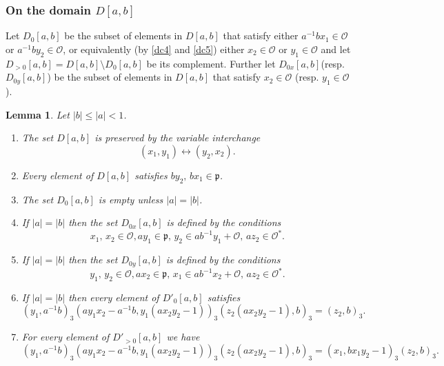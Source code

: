 \documentclass[12pt]{amsart}
\newcommand{\abs}[1]{\left|{#1}\right|}
\newcommand{\p}{\mathfrak{p}}
\renewcommand{\O}{\mathcal{O}}
\newtheorem{lemma}[theorem]{Lemma}
\theoremstyle{remark}
\begin{document}
\subsubsection{On the domain $D[a,b]$}
Let $D_0[a,b]$ be the subset of elements in $D[a,b]$ that satisfy either $a^{-1}bx_1\in\O$ or $a^{-1}by_2\in \O$, or equivalently (by \ref{dc4} and \ref{dc5}) either $x_2\in \O$ or $y_1\in\O$ and let $D_{>0}[a,b]=D[a,b]\setminus D_0[a,b]$ be its complement. Further let $D_{0x}[a,b]$(resp. $D_{0y}[a,b]$) be the subset of elements in $D[a,b]$ that satisfy $x_2\in\O$ (resp. $y_1\in \O$).
\begin{lemma}\label{lem d}
Let $\abs{b}\le \abs{a}<1$.
\begin{enumerate}
\item\label{part dsym} The set $D[a,b]$ is preserved by the variable interchange
\begin{equation}\label{eq dsym}
(x_1,y_1)\leftrightarrow (y_2,x_2).
\end{equation}
\item\label{part dxy} Every element of $D[a,b]$ satisfies $by_2,\,bx_1\in \p$.
\item\label{part d0} The set $D_0[a,b]$ is empty unless $\abs{a}=\abs{b}$.
\item\label{part d1} If $\abs{a}=\abs{b}$ then the set $D_{0x}[a,b]$ is defined by the conditions
\begin{equation}\label{eq d0x}
x_1,\,x_2\in \O,ay_1\in \p,\, y_2\in ab^{-1}y_1+\O,\,az_2\in\O^*.
\end{equation}
\item\label{part d2} If $\abs{a}=\abs{b}$ then the set $D_{0y}[a,b]$  is defined by the conditions
\begin{equation}\label{eq d0y}
y_1,\,y_2\in \O,ax_2\in \p,\, x_1\in ab^{-1}x_2+\O,\,az_2\in\O^*.
\end{equation}
\item\label{part d0kappa} If $\abs{a}=\abs{b}$ then every element of $D'_0[a,b]$ satisfies
\[
(y_1,a^{-1}b)_3(ay_1x_2-a^{-1}b,y_1(ax_2y_2-1))_3(z_2(ax_2y_2-1),b)_3 =(z_2,b)_3.
\]
\item\label{part dkappa} For every element of $D'_{>0}[a,b]$ we have 
\[
(y_1,a^{-1}b)_3(ay_1x_2-a^{-1}b,y_1(ax_2y_2-1))_3(z_2(ax_2y_2-1),b)_3 =(x_1,bx_1y_2-1)_3(z_2,b)_3.
\]
\end{enumerate}
\end{lemma}
\end{document}
